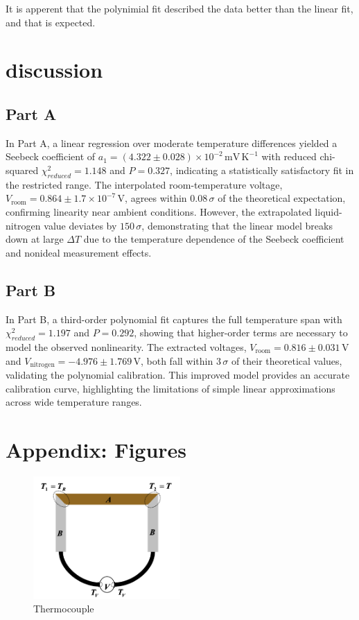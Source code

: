 \documentclass[12pt,a4paper]{report}
\begin{document}
It is apperent that the polynimial fit described the data better than the linear fit, and that is expected. 

\pagebreak
\section{discussion}

\subsection{Part A}
In Part A, a linear regression over moderate temperature differences yielded a Seebeck coefficient of 
$a_1 = (4.322 \pm 0.028)\times10^{-2}\,\mathrm{mV\,K^{-1}}$ with reduced chi-squared 
$\chi^2_{reduced} = 1.148$ and $P = 0.327$, indicating a statistically satisfactory fit in the restricted range. 
The interpolated room-temperature voltage, $V_{\mathrm{room}} = 0.864 \pm 1.7\times10^{-7}\,\mathrm{V}$, 
agrees within $0.08\,\sigma$ of the theoretical expectation, confirming linearity near ambient conditions. 
However, the extrapolated liquid-nitrogen value deviates by $150\,\sigma$, demonstrating that the linear 
model breaks down at large $\Delta T$ due to the temperature dependence of the Seebeck coefficient and 
nonideal measurement effects.


\subsection{Part B}
In Part B, a third-order polynomial fit captures the full temperature span with 
$\chi^2_{reduced} = 1.197$ and $P = 0.292$, showing that higher-order terms are necessary to model the 
observed nonlinearity. The extracted voltages, $V_{\mathrm{room}} = 0.816 \pm 0.031\,\mathrm{V}$ and 
$V_{\mathrm{nitrogen}} = -4.976 \pm 1.769\,\mathrm{V}$, both fall within $3\,\sigma$ of their theoretical 
values, validating the polynomial calibration. This improved model provides an accurate calibration curve, highlighting the limitations of simple linear approximations 
across wide temperature ranges.

\pagebreak
\appendix
\setcounter{figure}{0}
\setcounter{table}{0}
\section{Appendix: Figures}

\begin{figure}[H]
    \centering
    \includegraphics[width=0.5\textwidth]{general IMG/Kthermo.png}
    \caption{Thermocouple}
    \label{fig:thermocouple}
\end{figure}
\end{document}
